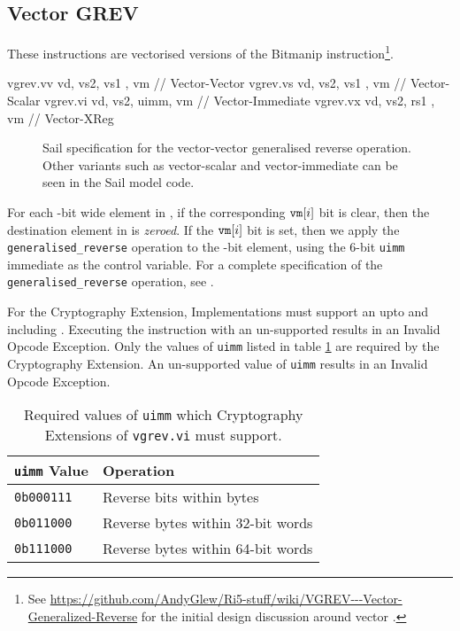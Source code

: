 \clearpage
\subsection{Vector GREV}

These instructions are vectorised versions of the Bitmanip
 instruction\footnote{
See \url{https://github.com/AndyGlew/Ri5-stuff/wiki/VGREV---Vector-Generalized-Reverse}
for the initial design discussion around vector .
}.

\begin{cryptoisa}
vgrev.vv     vd, vs2, vs1 , vm  // Vector-Vector
vgrev.vs     vd, vs2, vs1 , vm  // Vector-Scalar
vgrev.vi     vd, vs2, uimm, vm  // Vector-Immediate
vgrev.vx     vd, vs2, rs1 , vm  // Vector-XReg
\end{cryptoisa}

\begin{figure}[h]

\caption{
Sail specification for the vector-vector generalised reverse operation.
Other variants such as vector-scalar and vector-immediate can be seen in
the Sail model code.
}
\label{fig:sail:vgrev}
\end{figure}

For each \EEW-bit wide element in , if the corresponding ${\tt vm}[i]$
bit is clear, then the destination element in \vrd is {\em zeroed}.
If the ${\tt vm}[i]$ bit is set, then we apply the
\texttt{generalised\_reverse} operation to the \EEW-bit element, using the
$6$-bit \texttt{uimm} immediate as the control variable.
For a complete specification of the \texttt{generalised\_reverse}
operation, see 
\cite[Section 2.2.2, Generalized Reverse]{riscv:bitmanip:draft}.

For the Cryptography Extension,
Implementations must support an \EEW upto and including \XLEN.
Executing the instruction with an un-supported \EEW results in an
Invalid Opcode Exception.
Only the values of \texttt{uimm} listed in table \ref{tab:vgrev:uimm}
are required by the Cryptography Extension.
An un-supported value of \texttt{uimm} results in an
Invalid Opcode Exception.

\begin{table}
\centering
\begin{tabular}{ll}
\texttt{uimm} Value & Operation                         \\
\hline
\texttt{0b000111}   & Reverse bits within bytes         \\
\texttt{0b011000}   & Reverse bytes within 32-bit words \\
\texttt{0b111000}   & Reverse bytes within 64-bit words \\
\hline
\end{tabular}
\caption{Required values of \texttt{uimm} which Cryptography Extensions
of \texttt{vgrev.vi} must support.}
\label{tab:vgrev:uimm}
\end{table}

